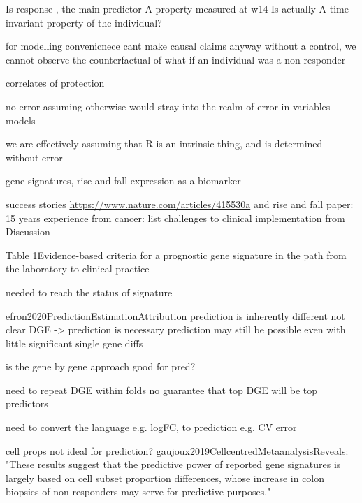 \begin{outline}
            Is response , the main predictor
            A property measured at w14
            Is actually A time invariant property of the individual?

            for modelling convenicnece
            cant make causal claims anyway
                without a control, we cannot observe the counterfactual of what if an individual was a non-responder

            correlates of protection

            no error
                assuming otherwise would stray into the realm of error in variables models
            
                we are effectively assuming that R is an intrinsic thing, and is determined without error

        gene signatures, rise and fall
            expression as a biomarker

            success stories \url{https://www.nature.com/articles/415530a} 
            and
            rise and fall paper: 15 years experience from cancer: list challenges to clinical implementation from Discussion

            Table 1Evidence-based criteria for a prognostic gene signature in the path from the laboratory to clinical practice

        needed to reach the status of signature
        
    efron2020PredictionEstimationAttribution prediction is inherently different
            not clear DGE -> prediction is necessary
            prediction may still be possible even with little significant single gene diffs

            is the gene by gene approach good for pred?
        
        need to repeat DGE within folds
            no guarantee that top DGE will be top predictors

        need to convert the language e.g. logFC, to prediction e.g. CV error

        cell props not ideal for prediction?
            gaujoux2019CellcentredMetaanalysisReveals: "These results suggest that the predictive power of reported gene signatures is largely based on cell subset proportion differences, whose increase in colon biopsies of non-responders may serve for predictive purposes."


\end{outline}
